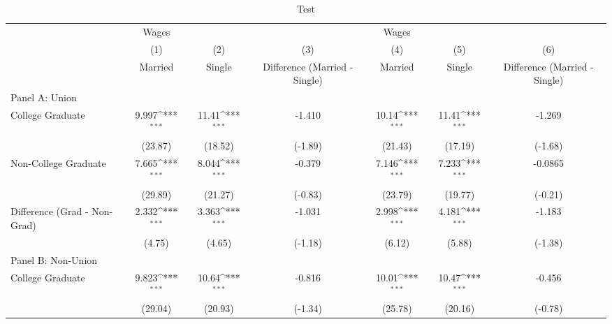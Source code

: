\begin{table}[htbp]\centering
\def\sym#1{\ifmmode^{#1}\else\(^{#1}\)\fi}
\caption{Test}
\begin{tabular}{l*{6}{c}}
\toprule
            &       Wages         &                     &                     &       Wages         &                     &                     \\
            &\multicolumn{1}{c}{(1)}&\multicolumn{1}{c}{(2)}&\multicolumn{1}{c}{(3)}&\multicolumn{1}{c}{(4)}&\multicolumn{1}{c}{(5)}&\multicolumn{1}{c}{(6)}\\
            &\multicolumn{1}{c}{Married}&\multicolumn{1}{c}{Single}&\multicolumn{1}{c}{Difference (Married - Single)}&\multicolumn{1}{c}{Married}&\multicolumn{1}{c}{Single}&\multicolumn{1}{c}{Difference (Married - Single)}\\
\midrule
Panel A: Union&                     &                     &                     &                     &                     &                     \\
College Graduate&       9.997\sym{***}&       11.41\sym{***}&      -1.410         &       10.14\sym{***}&       11.41\sym{***}&      -1.269         \\
            &     (23.87)         &     (18.52)         &     (-1.89)         &     (21.43)         &     (17.19)         &     (-1.68)         \\
Non-College Graduate&       7.665\sym{***}&       8.044\sym{***}&      -0.379         &       7.146\sym{***}&       7.233\sym{***}&     -0.0865         \\
            &     (29.89)         &     (21.27)         &     (-0.83)         &     (23.79)         &     (19.77)         &     (-0.21)         \\
Difference (Grad - Non-Grad)&       2.332\sym{***}&       3.363\sym{***}&      -1.031         &       2.998\sym{***}&       4.181\sym{***}&      -1.183         \\
            &      (4.75)         &      (4.65)         &     (-1.18)         &      (6.12)         &      (5.88)         &     (-1.38)         \\
\midrule
Panel B: Non-Union&                     &                     &                     &                     &                     &                     \\
College Graduate&       9.823\sym{***}&       10.64\sym{***}&      -0.816         &       10.01\sym{***}&       10.47\sym{***}&      -0.456         \\
            &     (29.04)         &     (20.93)         &     (-1.34)         &     (25.78)         &     (20.16)         &     (-0.78)         \\

\end{tabular}
\end{table}
